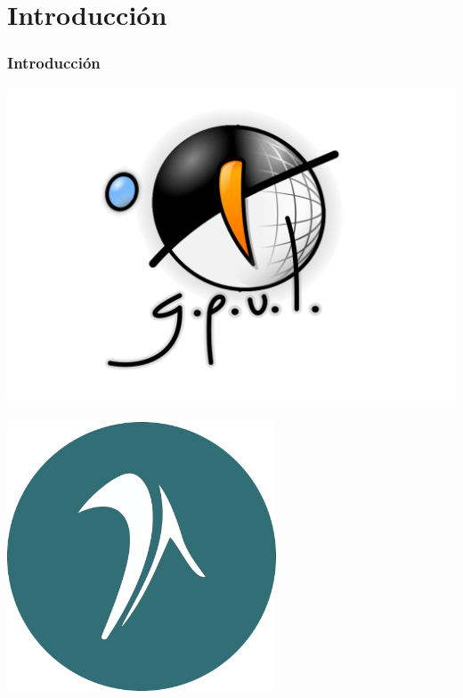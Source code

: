 \section{Introducción}
\begin{frame}
    \frametitle{Introducción}
    \begin{minipage}[c]{0.45\textwidth}
        \includegraphics[width=\textwidth]{images/logo_gpul.png}
    \end{minipage}
    \hfill
    \begin{minipage}[c]{0.45\textwidth}
        \includegraphics[width=0.6\textwidth]{images/logo_dafic.png}
    \end{minipage}
\end{frame}

